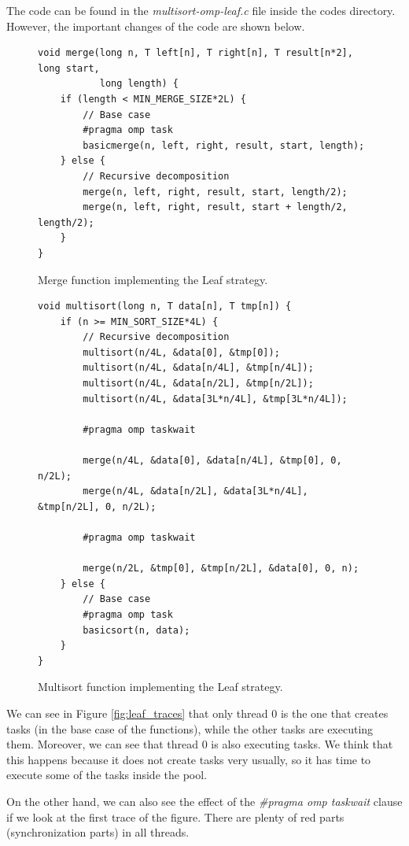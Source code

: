 \documentclass[12pt, a4paper]{article}
\begin{document}
The code can be found in the \textit{multisort-omp-leaf.c} file inside the codes directory. However, the important changes of the code are shown below.

\begin{figure}[H]
\begin{lstlisting}
void merge(long n, T left[n], T right[n], T result[n*2], long start,
		   long length) {
    if (length < MIN_MERGE_SIZE*2L) {
        // Base case
        #pragma omp task
        basicmerge(n, left, right, result, start, length);
    } else {
        // Recursive decomposition
        merge(n, left, right, result, start, length/2);
        merge(n, left, right, result, start + length/2, length/2);
    }
}
\end{lstlisting}

\caption{Merge function implementing the Leaf strategy.}
\end{figure}

\begin{figure}[H]
\begin{lstlisting}
void multisort(long n, T data[n], T tmp[n]) {
    if (n >= MIN_SORT_SIZE*4L) {
        // Recursive decomposition
		multisort(n/4L, &data[0], &tmp[0]);
		multisort(n/4L, &data[n/4L], &tmp[n/4L]);
		multisort(n/4L, &data[n/2L], &tmp[n/2L]);
		multisort(n/4L, &data[3L*n/4L], &tmp[3L*n/4L]);
		
		#pragma omp taskwait
		
		merge(n/4L, &data[0], &data[n/4L], &tmp[0], 0, n/2L);
		merge(n/4L, &data[n/2L], &data[3L*n/4L], &tmp[n/2L], 0, n/2L);
		
		#pragma omp taskwait
		
        merge(n/2L, &tmp[0], &tmp[n/2L], &data[0], 0, n);
	} else {
		// Base case
		#pragma omp task
		basicsort(n, data);
	}
}
\end{lstlisting}

\caption{Multisort function implementing the Leaf strategy.}
\end{figure}

We can see in Figure \ref{fig:leaf_traces} that only thread 0 is the one that creates tasks (in the base case of the functions), while the other tasks are executing them. Moreover, we can see that thread 0 is also executing tasks. We think that this happens because it does not create tasks very usually, so it has time to execute some of the tasks inside the pool.

On the other hand, we can also see the effect of the \textit{\#pragma omp taskwait} clause if we look at the first trace of the figure. There are plenty of red parts (synchronization parts) in all threads.
\end{document}

